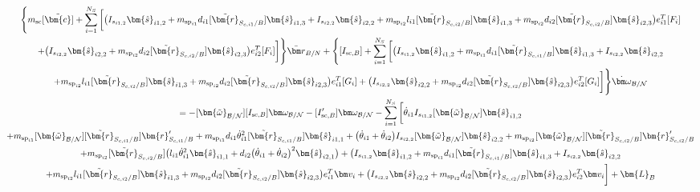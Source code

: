 \documentclass[paper]{aiaaNew}
\begin{document}
	\begin{multline}
\Bigg \lbrace m_{\text{sc}} [\tilde{\bm{c}}] + \sum\limits_{i=1}^{N_S} \bigg[  \big(I_{s_{i1,2}}\bm{\hat{s}}_{i1,2}+m_{\text{sp}_{i1}}d_{i1} [\tilde{\bm{r}}_{S_{c,i1}/B}]   \bm{\hat{s}}_{i1,3} + I_{s_{i2,2}}\bm{\hat{s}}_{i2,2}
+m_{\text{sp}_{i2}}l_{i1} [\tilde{\bm{r}}_{S_{c,i2}/B}]  \bm{\hat{s}}_{i1,3}+m_{\text{sp}_{i2}}d_{i2} [\tilde{\bm{r}}_{S_{c,i2}/B}] \bm{\hat{s}}_{i2,3}\big)e_{i1}^T[F_i]\\
 +\big( I_{s_{i2,2}}\bm{\hat{s}}_{i2,2}+m_{\text{sp}_{i2}} d_{i2} [\tilde{\bm{r}}_{S_{c,i2}/B}] \bm{\hat{s}}_{i2,3}\big)e_{i2}^T[F_i] \bigg]\Bigg \rbrace \ddot{\bm r}_{B/N}
+ \Bigg \lbrace [I_{\text{sc},B}] + \sum\limits_{i=1}^{N_S} \bigg[  \big(I_{s_{i1,2}}\bm{\hat{s}}_{i1,2}+m_{\text{sp}_{i1}}d_{i1} [\tilde{\bm{r}}_{S_{c,i1}/B}]   \bm{\hat{s}}_{i1,3} + I_{s_{i2,2}}\bm{\hat{s}}_{i2,2}\\
+m_{\text{sp}_{i2}}l_{i1} [\tilde{\bm{r}}_{S_{c,i2}/B}]  \bm{\hat{s}}_{i1,3}+m_{\text{sp}_{i2}}d_{i2} [\tilde{\bm{r}}_{S_{c,i2}/B}] \bm{\hat{s}}_{i2,3}\big)e_{i1}^T[G_i] +\big( I_{s_{i2,2}}\bm{\hat{s}}_{i2,2}+m_{\text{sp}_{i2}} d_{i2} [\tilde{\bm{r}}_{S_{c,i2}/B}] \bm{\hat{s}}_{i2,3}\big)e_{i2}^T[G_i] \bigg]\Bigg \rbrace \dot{\bm\omega}_{\cal B/N}\\
= -[\bm{\tilde{\omega}}_{\cal B/N}] [I_{\text{sc},B}] \bm\omega_{\cal B/N} - [I'_{\text{sc},B}] \bm\omega_{\cal B/N} 
-  \sum\limits_{i=1}^{N_S} \bigg[
\dot{\theta}_{i1} I_{s_{i1,2}} [\bm{\tilde{\omega}}_{\cal B/N}] \bm{\hat{s}}_{i1,2} 
\\+m_{\text{sp}_{i1}} [\bm{\tilde{\omega}}_{\cal B/N}] [\tilde{\bm{r}}_{S_{c,i1}/B}] \bm{r}'_{S_{c,i1}/B} +m_{\text{sp}_{i1}}d_{i1}\dot{\theta}_{i1}^2  [\tilde{\bm{r}}_{S_{c,i1}/B}] \bm{\hat{s}}_{i1,1}
+ \big(\dot{\theta}_{i1}+\dot{\theta}_{i2}\big) I_{s_{i2,2}}[\bm{\tilde{\omega}}_{\cal B/N}]\bm{\hat{s}}_{i2,2}
+m_{\text{sp}_{i2}} [\bm{\tilde{\omega}}_{\cal B/N}] [\tilde{\bm{r}}_{S_{c,i2}/B}] \bm{r}'_{S_{c,i2}/B} 	\\+m_{\text{sp}_{i2}} [\tilde{\bm{r}}_{S_{c,i2}/B}] \big(l_{i1} \dot{\theta}_{i1}^2 \bm{\hat{s}}_{i1,1} + d_{i2}\big(\dot{\theta}_{i1} + \dot{\theta}_{i2}\big)^2\bm{\hat{s}}_{i2,1}\big) +   \big(I_{s_{i1,2}}\bm{\hat{s}}_{i1,2}+m_{\text{sp}_{i1}}d_{i1} [\tilde{\bm{r}}_{S_{c,i1}/B}]   \bm{\hat{s}}_{i1,3} + I_{s_{i2,2}}\bm{\hat{s}}_{i2,2}\\
+m_{\text{sp}_{i2}}l_{i1} [\tilde{\bm{r}}_{S_{c,i2}/B}]  \bm{\hat{s}}_{i1,3}+m_{\text{sp}_{i2}}d_{i2} [\tilde{\bm{r}}_{S_{c,i2}/B}] \bm{\hat{s}}_{i2,3}\big)e_{i1}^T\bm v_i+\big( I_{s_{i2,2}}\bm{\hat{s}}_{i2,2}+m_{\text{sp}_{i2}} d_{i2} [\tilde{\bm{r}}_{S_{c,i2}/B}] \bm{\hat{s}}_{i2,3}\big)e_{i2}^T\bm v_i\bigg]
+ \bm{L}_B 
\label{eq:Final8}
\end{multline}
\end{document}
